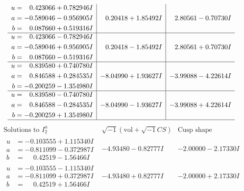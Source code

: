 \documentclass[1p]{elsarticle_modified}
\theoremstyle{definition}
\newcommand{\I}{\sqrt{-1}}
\begin{document}
$$\begin{array}{c|c|c}
\begin{aligned}
u &= \phantom{-}0.423066 + 0.782946 I \\
a &= -0.589046 - 0.956905 I \\
b &= \phantom{-}0.087660 + 0.519316 I\end{aligned}
 & \phantom{-}0.20418 + 1.85492 I & \phantom{-}2.80561 - 0.70730 I \\ \hline\begin{aligned}
u &= \phantom{-}0.423066 - 0.782946 I \\
a &= -0.589046 + 0.956905 I \\
b &= \phantom{-}0.087660 - 0.519316 I\end{aligned}
 & \phantom{-}0.20418 - 1.85492 I & \phantom{-}2.80561 + 0.70730 I \\ \hline\begin{aligned}
u &= \phantom{-}0.839580 + 0.740780 I \\
a &= \phantom{-}0.846588 + 0.284535 I \\
b &= -0.200259 - 1.354980 I\end{aligned}
 & -8.04990 + 1.93627 I & -3.99088 - 4.22614 I \\ \hline\begin{aligned}
u &= \phantom{-}0.839580 - 0.740780 I \\
a &= \phantom{-}0.846588 - 0.284535 I \\
b &= -0.200259 + 1.354980 I\end{aligned}
 & -8.04990 - 1.93627 I & -3.99088 + 4.22614 I\\
 \hline 
 \end{array}$$\newpage$$\begin{array}{c|c|c}  
\text{Solutions to }I^u_{2}& \I (\text{vol} + \sqrt{-1}CS) & \text{Cusp shape}\\
 \hline 
\begin{aligned}
u &= -0.103555 + 1.115340 I \\
a &= -0.811099 - 0.372987 I \\
b &= \phantom{-}0.42519 - 1.56466 I\end{aligned}
 & -4.93480 - 0.82777 I & -2.00000 - 2.17330 I \\ \hline\begin{aligned}
u &= -0.103555 - 1.115340 I \\
a &= -0.811099 + 0.372987 I \\
b &= \phantom{-}0.42519 + 1.56466 I\end{aligned}
 & -4.93480 + 0.82777 I & -2.00000 + 2.17330 I \\ \hline\begin{aligned}

\end{aligned}
\end{array}$$
\end{document}
